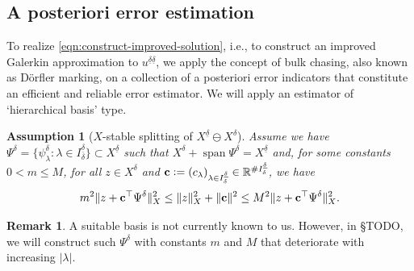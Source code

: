 \documentclass[11pt,a4paper,oneside,english]{amsart}
\numberwithin{equation}{section}
\numberwithin{theorem}{section}
\newtheorem{assum}[theorem]{Assumption}
\theoremstyle{definition}
\newtheorem{remark}[theorem]{Remark}
\newcommand{\R}{\mathbb{R}}
\DeclareMathOperator{\spann}{span}
\newcommand{\udelta}{{\underline{\delta}}}
\newcommand{\jw}[1]{{\color{red}{JW: #1}}}
\begin{document}
\subsection{A posteriori error estimation}
To realize \eqref{eqn:construct-improved-solution}, i.e., to construct an improved
Galerkin approximation to $u^{\udelta \udelta}$, we apply the concept of bulk
chasing, also known as D\"{o}rfler marking, on a collection of a posteriori error
indicators that constitute an efficient and reliable error estimator. We will apply
an estimator of `hierarchical basis' type.

\begin{assum}[$X$-stable splitting of $X^{\udelta} \ominus X^\delta$]
  \jw{is dit een juiste naam voor deze assumption?}
  Assume we have $\Psi^\delta=\{\psi^\delta_\lambda\colon \lambda \in I_\delta^\udelta\} \subset X^\udelta$
  such that $X^\delta + \spann \Psi^\delta=X^\udelta$ and, for some constants $0<m\leq M$,
  for all $z \in X^\delta$ and ${\bf c} := (c_\lambda)_{\lambda \in I_\delta^\udelta} \in \R^{\# I_\delta^\udelta}$, we have
  \begin{equation}
    m^2 \|z+{\bf c}^\top \Psi^\delta\|_X^2
    \leq \|z\|_X^2+\|{\bf c}\|^2
    \leq M^2 \|z+{\bf c}^\top \Psi^\delta\|_X^2.
  \label{eqn:X-stable-splitting}
  \end{equation}
  \label{assum:X-stable-splitting}
\end{assum}
\begin{remark}
  A suitable basis is not currently known to us. However, in \S TODO, we will construct
  such $\Psi^\delta$ with constants $m$ and $M$ that deteriorate with increasing $|\lambda|$.
  \jw{is die constructie iets dat we misschien in een appendix willen zetten?}
\end{remark}
\end{document}
